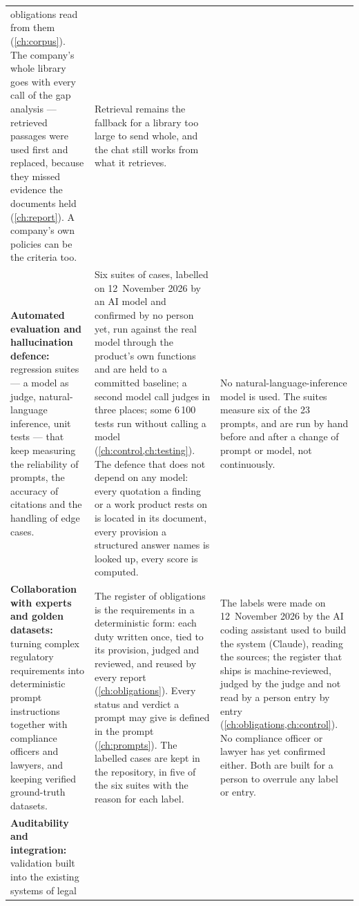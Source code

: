 \begin{xltabular}{\textwidth}{@{}L{34mm}YY@{}}
  obligations read from them (\cref{ch:corpus}). The company's whole library goes with every call of the gap analysis ---
  retrieved passages were used first and replaced, because they missed evidence the documents
  held (\cref{ch:report}). A company's own policies can be the criteria too. &
  Retrieval remains the fallback for a library too large to send whole, and the chat still
  works from what it retrieves. \\
\textbf{Automated evaluation and hallucination defence:} regression suites --- a model as
  judge, natural-language inference, unit tests --- that keep measuring the reliability of
  prompts, the accuracy of citations and the handling of edge cases. &
  Six suites of cases, labelled on 12~November 2026 by an AI model and confirmed by no person
  yet, run against the real model through the product's own functions and are held to a
  committed baseline; a second model call judges in three places; some 6\,100 tests run without
  calling a model (\cref{ch:control,ch:testing}). The defence that does not depend on any
  model: every quotation a finding or a work product rests on is located in its document,
  every provision a structured answer names is looked up, every score is computed. &
  No natural-language-inference model is used. The suites measure six of the 23 prompts,
  and are run by hand before and after a change of prompt or model, not continuously. \\
\textbf{Collaboration with experts and golden datasets:} turning complex regulatory
  requirements into deterministic prompt instructions together with compliance officers and
  lawyers, and keeping verified ground-truth datasets. &
  The register of obligations is the requirements in a deterministic form: each duty written
  once, tied to its provision, judged and reviewed, and reused by every report
  (\cref{ch:obligations}). Every status and verdict a prompt may give is defined in the prompt
  (\cref{ch:prompts}). The labelled cases are kept in the repository, in five of the six
  suites with the reason for each label. &
  The labels were made on 12~November 2026 by the AI coding assistant used to build the
  system (Claude), reading the sources; the register that ships is machine-reviewed, judged
  by the judge and not read by a person entry by entry (\cref{ch:obligations,ch:control}). No
  compliance officer or lawyer
  has yet confirmed either. Both are built for a person to overrule any label or entry. \\
\textbf{Auditability and integration:} validation built into the existing systems of legal

\end{xltabular}
